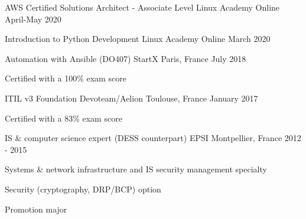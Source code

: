 

\begin{cventries}

  \cventry
    {AWS Certified Solutions Architect - Associate Level} %
    {Linux Academy} %
    {Online} %
    {April-May 2020} %
    {}

  \cventry
    {Introduction to Python Development} %
    {Linux Academy} %
    {Online} %
    {March 2020} %
    {}

  \cventry
    {Automation with Ansible (DO407)} %
    {StartX} %
    {Paris, France} %
    {July 2018} %
    {
      \begin{cvitems} %
        \item {Certified with a 100\% exam score}
      \end{cvitems}
    }

  \cventry
    {ITIL v3 Foundation} %
    {Devoteam/Aelion} %
    {Toulouse, France} %
    {January 2017} %
    {
      \begin{cvitems} %
        \item {Certified with a 83\% exam score}
      \end{cvitems}
    }

  \cventry
    {IS \& computer science expert (DESS counterpart)} %
    {EPSI} %
    {Montpellier, France} %
    {2012 - 2015} %
    {
      \begin{cvitems} %
        \item {Systems \& network infrastructure and IS security management specialty}
        \item {Security (cryptography, DRP/BCP) option}
        \item {Promotion major}
      \end{cvitems}
    }


\end{cventries}
